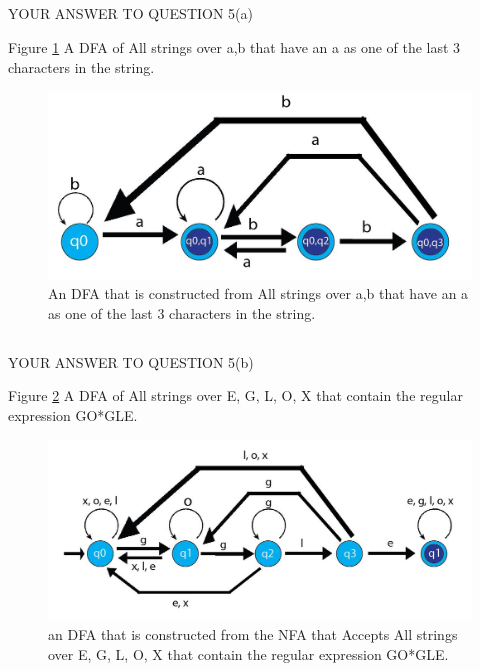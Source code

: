 \documentclass{article}
\begin{document}
\subsection{}
YOUR ANSWER TO QUESTION 5(a)

Figure \ref{fig:bdfa} A DFA of All strings over {a,b} that have an a as one of the last 3 characters in the string.
\begin{figure}
  \includegraphics[width=\linewidth]{bdfa.JPG}
  \caption{ An DFA that is constructed from All strings over {a,b} that have an a as one of the last 3 characters in the string.}
  \label{fig:bdfa}
\end{figure}

\subsection{}
YOUR ANSWER TO QUESTION 5(b)

Figure \ref{fig:googledfa} A DFA of All strings over {E, G, L, O, X} that contain the regular expression GO*GLE.
\begin{figure}
  \includegraphics[width=\linewidth]{googledfa.JPG}
  \caption{ an DFA that is constructed from the NFA that Accepts All strings over {E, G, L, O, X} that contain the regular expression GO*GLE.}
  \label{fig:googledfa}
\end{figure}


\end{document}
